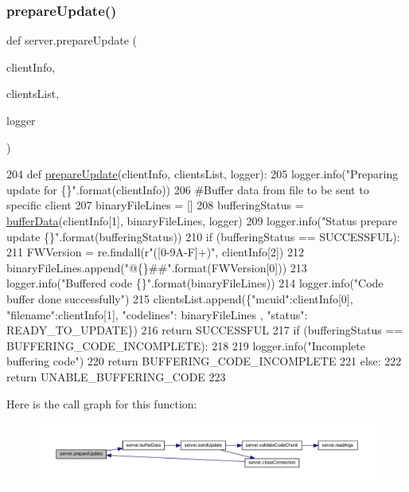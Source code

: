 \subsubsection{\texorpdfstring{prepare\+Update()}{prepareUpdate()}}
{\footnotesize\ttfamily def server.\+prepare\+Update (\begin{DoxyParamCaption}\item[{}]{client\+Info,  }\item[{}]{clients\+List,  }\item[{}]{logger }\end{DoxyParamCaption})}


\begin{DoxyCode}
204 \textcolor{keyword}{def }\hyperlink{namespaceserver_a4ab7e63c5f934dfea50b006468f9efca}{prepareUpdate}(clientInfo, clientsList, logger):
205      logger.info(\textcolor{stringliteral}{"Preparing update for \{\}"}.format(clientInfo))
206      \textcolor{comment}{#Buffer data from file to be sent to specific client}
207      binaryFileLines = []
208      bufferingStatus = \hyperlink{namespaceserver_a6098d5cffff301a01e793c84215c4512}{bufferData}(clientInfo[1], binaryFileLines, logger)
209      logger.info(\textcolor{stringliteral}{"Status prepare update \{\}"}.format(bufferingStatus))
210      \textcolor{keywordflow}{if} (bufferingStatus == SUCCESSFUL):
211           FWVersion = re.findall(\textcolor{stringliteral}{r"([0-9A-F]+)"}, clientInfo[2])
212           binaryFileLines.append(\textcolor{stringliteral}{"@\{\}##"}.format(FWVersion[0]))
213           logger.info(\textcolor{stringliteral}{"Buffered code \{\}"}.format(binaryFileLines))
214           logger.info(\textcolor{stringliteral}{"Code buffer done successfully"}) 
215           clientsList.append(\{\textcolor{stringliteral}{"mcuid"}:clientInfo[0], \textcolor{stringliteral}{"filename"}:clientInfo[1], \textcolor{stringliteral}{"codelines"}: binaryFileLines
      , \textcolor{stringliteral}{"status"}: READY\_TO\_UPDATE\})                 
216           \textcolor{keywordflow}{return} SUCCESSFUL
217      \textcolor{keywordflow}{if} (bufferingStatus == BUFFERING\_CODE\_INCOMPLETE):
218           
219           logger.info(\textcolor{stringliteral}{"Incomplete buffering code"})
220           \textcolor{keywordflow}{return} BUFFERING\_CODE\_INCOMPLETE
221      \textcolor{keywordflow}{else}:
222           \textcolor{keywordflow}{return} UNABLE\_BUFFERING\_CODE
223 
\end{DoxyCode}
Here is the call graph for this function\+:
\nopagebreak
\begin{figure}[H]
\begin{center}
\leavevmode
\includegraphics[width=350pt]{namespaceserver_a4ab7e63c5f934dfea50b006468f9efca_cgraph}
\end{center}
\end{figure}
